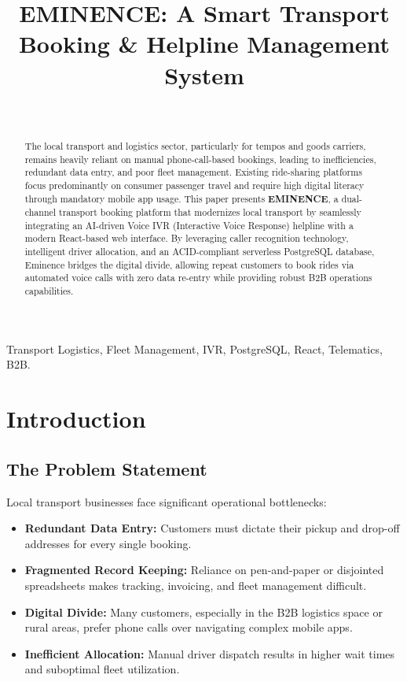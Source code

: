 \documentclass[journal,10pt,twocolumn]{IEEEtran}
\begin{document}
\title{EMINENCE: A Smart Transport Booking \& Helpline Management System}

\author{
    \\
}

\maketitle

\begin{abstract}
The local transport and logistics sector, particularly for tempos and goods carriers, remains heavily reliant on manual phone-call-based bookings, leading to inefficiencies, redundant data entry, and poor fleet management. Existing ride-sharing platforms focus predominantly on consumer passenger travel and require high digital literacy through mandatory mobile app usage. This paper presents \textbf{EMINENCE}, a dual-channel transport booking platform that modernizes local transport by seamlessly integrating an AI-driven Voice IVR (Interactive Voice Response) helpline with a modern React-based web interface. By leveraging caller recognition technology, intelligent driver allocation, and an ACID-compliant serverless PostgreSQL database, Eminence bridges the digital divide, allowing repeat customers to book rides via automated voice calls with zero data re-entry while providing robust B2B operations capabilities.
\end{abstract}

\begin{IEEEkeywords}
Transport Logistics, Fleet Management, IVR, PostgreSQL, React, Telematics, B2B.
\end{IEEEkeywords}

\section{Introduction}

\subsection{The Problem Statement}
Local transport businesses face significant operational bottlenecks:
\begin{itemize}
    \item \textbf{Redundant Data Entry:} Customers must dictate their pickup and drop-off addresses for every single booking.
    \item \textbf{Fragmented Record Keeping:} Reliance on pen-and-paper or disjointed spreadsheets makes tracking, invoicing, and fleet management difficult.
    \item \textbf{Digital Divide:} Many customers, especially in the B2B logistics space or rural areas, prefer phone calls over navigating complex mobile apps.
    \item \textbf{Inefficient Allocation:} Manual driver dispatch results in higher wait times and suboptimal fleet utilization.
\end{itemize}
\end{document}
